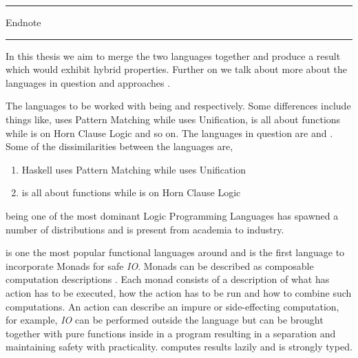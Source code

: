 \documentclass[thesis-solanki.tex]{subfiles}
\begin{document}
\noindent
\textcolor{blue}{\rule{0.40\textwidth}{2pt}}
Endnote
\textcolor{blue}{\rule{0.40\textwidth}{2pt}}
In this thesis we aim to merge the two languages together and produce a result which would exhibit hybrid properties. Further on we talk
about more about the languages in question and approaches . 

\par

The languages to be worked with being  and  respectively.
Some differences include things like,  uses Pattern Matching while  uses
Unification,  is all about functions while  is on Horn Clause Logic and so
on.
The languages in question are  and . Some of the dissimilarities between the languages are,
\begin{enumerate}
\item { Haskell} uses Pattern Matching while  uses Unification

\item {} is all about functions while  is on Horn Clause Logic
\end{enumerate} 

 \cite{wikiprolog} being one of the most dominant Logic Programming Languages has 
spawned a number of distributions and is present from academia to industry.  

 is one the most popular \cite{website:langpop} functional languages around and is the 
first language to incorporate Monads \cite{wadler1992comprehending} for safe \textit{IO}. Monads can be 
described as composable computation descriptions \cite{website:monadshaskellorg} . Each monad consists of a 
description of what has action has to be executed, how the action has to be run and how to combine such 
computations. An action can describe an impure or side-effecting computation, for example, \textit{IO} can be 
performed outside the language but can be brought together with pure functions inside in a program resulting in a 
separation and maintaining safety with practicality.  computes results lazily and is strongly 
typed. 
\end{document}
